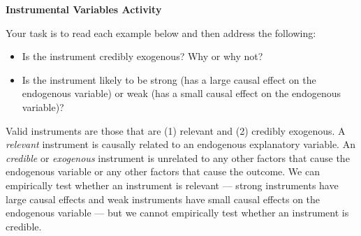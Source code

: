 \documentclass[a4paper,12pt]{article}
\begin{document}
\begin{center}
\textbf{Instrumental Variables Activity}
\end{center}

\noindent Your task is to read each example below and then address the following:
\begin{itemize}
\item Is the instrument credibly exogenous? Why or why not?
\item Is the instrument likely to be strong (has a large causal effect on the endogenous variable) or weak (has a small causal effect on the endogenous variable)?
\end{itemize}

\noindent Valid instruments are those that are (1) relevant and (2) credibly exogenous. A {\em relevant} instrument is causally related to an endogenous explanatory variable. An {\em credible} or {\em exogenous} instrument is unrelated to any other factors that cause the endogenous variable or any other factors that cause the outcome. We can empirically test whether an instrument is relevant --- strong instruments have large causal effects and weak instruments have small causal effects on the endogenous variable --- but we cannot empirically test whether an instrument is credible.
\end{document}
